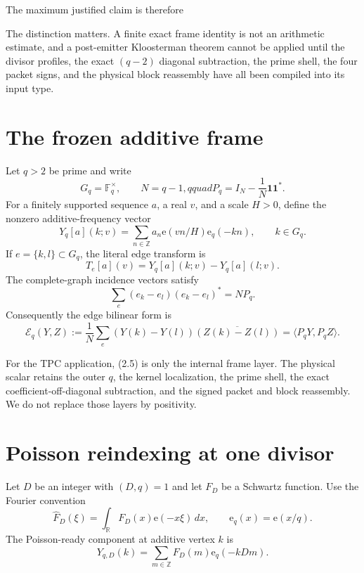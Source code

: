 \documentclass[11pt]{article}
\newcommand{\Fq}{\mathbb F_q}
\newcommand{\e}{\mathrm e}
\newcommand{\one}{\mathbf 1}
\newcommand{\Gq}{G_q}
\newcommand{\cE}{\mathcal E}
\begin{document}
The maximum justified claim is therefore

\begin{center}
\end{center}

The distinction matters.  A finite exact frame identity is not an arithmetic
estimate, and a post-emitter Kloosterman theorem cannot be applied until the
divisor profiles, the exact $(q-2)$ diagonal subtraction, the prime shell, the
four packet signs, and the physical block reassembly have all been compiled
into its input type.

\section{The frozen additive frame}

Let $q>2$ be prime and write
\[
 \Gq=\Fq^\times,\qquad N=q-1,qquad
 P_q=I_N-\frac1N\one\one^*.
 \tag{2.1}
\]
For a finitely supported sequence $a$, a real $v$, and a scale $H>0$, define
the nonzero additive-frequency vector
\[
 Y_q[a](k;v)=\sum_{n\in\mathbb Z}a_n\e(vn/H)\e_q(-kn),
 \qquad k\in\Gq.
 \tag{2.2}
\]
If $e=\{k,l\}\subset\Gq$, the literal edge transform is
\[
 T_e[a](v)=Y_q[a](k;v)-Y_q[a](l;v).
 \tag{2.3}
\]
The complete-graph incidence vectors satisfy
\[
 \sum_{e} (e_k-e_l)(e_k-e_l)^*=NP_q.
 \tag{2.4}
\]
Consequently the edge bilinear form is
\[
 \cE_q(Y,Z):=\frac1N\sum_e (Y(k)-Y(l))
 \overline{(Z(k)-Z(l))}
 =\langle P_qY,P_qZ\rangle.
 \tag{2.5}
\]

For the TPC application, (2.5) is only the internal frame layer.  The
physical scalar retains the outer $q$, the kernel localization, the prime
shell, the exact coefficient-off-diagonal subtraction, and the signed packet
and block reassembly.  We do not replace those layers by positivity.

\section{Poisson reindexing at one divisor}

Let $D$ be an integer with $(D,q)=1$ and let $F_D$ be a Schwartz function.
Use the Fourier convention
\[
 \widehat F_D(\xi)=\int_{\mathbb R}F_D(x)\e(-x\xi)\,dx,
 \qquad \e_q(x)=\e(x/q).
 \tag{3.1}
\]
The Poisson-ready component at additive vertex $k$ is
\[
 Y_{q,D}(k)=\sum_{m\in\mathbb Z}F_D(m)\e_q(-kDm).
 \tag{3.2}
\]
\end{document}
